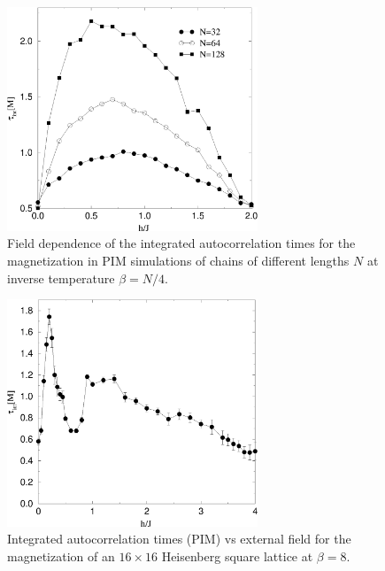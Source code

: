 \documentclass[10pt,pre,aps,twocolumn,showpacs,superscriptaddress,
floatfix]{revtex4}
\begin{document}
\begin{figure}
\includegraphics[clip,width=7.5cm]{fig24.eps}
\caption{Field dependence of the integrated autocorrelation times for the 
magnetization in PIM simulations of chains of different lengths $N$ at inverse 
temperature $\beta=N/4$.}
\label{pim_magall}
\end{figure}   

\begin{figure}
\includegraphics[clip,width=7.5cm]{fig25.eps}
\caption{Integrated autocorrelation times (PIM) vs external field for the 
magnetization of an $16 \times 16$ Heisenberg square lattice at $\beta=8$.} 
\label{pim_mag2d}
\end{figure}
\end{document}
